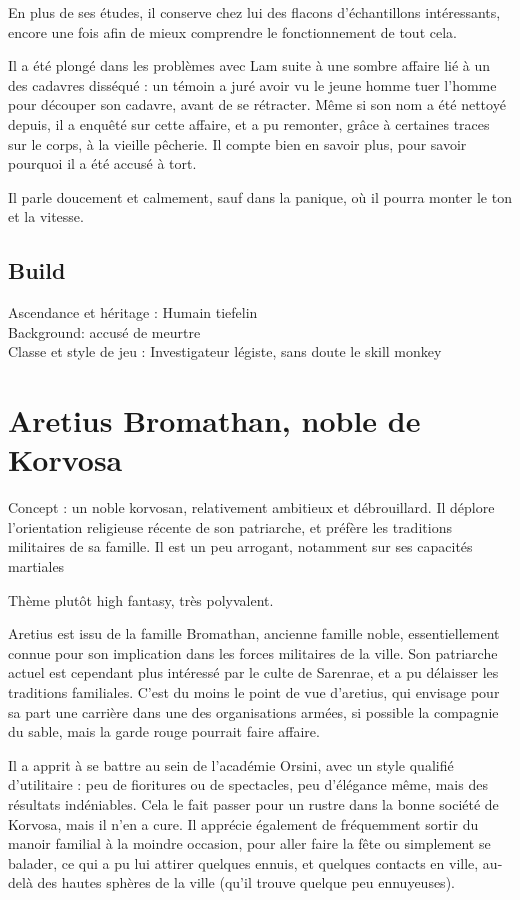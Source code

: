 \documentclass[10pt,a4paper]{book}
\begin{document}
En plus de ses études, il conserve chez lui des flacons d'échantillons intéressants, encore une fois afin de mieux comprendre le fonctionnement de tout cela. 

Il a été plongé dans les problèmes avec Lam suite à une sombre affaire lié à un des cadavres disséqué : un témoin a juré avoir vu le jeune homme tuer l'homme pour découper son cadavre, avant de se rétracter. Même si son nom a été nettoyé depuis, il a enquêté sur cette affaire, et a pu remonter, grâce à certaines traces sur le corps, à la vieille pêcherie. Il compte bien en savoir plus, pour savoir pourquoi il a été accusé à tort.

Il parle doucement et calmement, sauf dans la panique, où il pourra monter le ton et la vitesse.

\subsection{Build}
Ascendance et héritage : Humain tiefelin \\
Background: accusé de meurtre \\
Classe et style de jeu : Investigateur légiste, sans doute le skill monkey\\


\section{Aretius Bromathan, noble de Korvosa}
Concept : un noble korvosan, relativement ambitieux et débrouillard. Il déplore l'orientation religieuse récente de son patriarche, et préfère les traditions militaires de sa famille. Il est un peu arrogant, notamment sur ses capacités martiales

Thème plutôt high fantasy, très polyvalent.

Aretius est issu de la famille Bromathan, ancienne famille noble, essentiellement connue pour son implication dans les forces militaires de la ville. Son patriarche actuel est cependant plus intéressé par le culte de Sarenrae, et a pu délaisser les traditions familiales. C'est du moins le point de vue d'aretius, qui envisage pour sa part une carrière dans une des organisations armées, si possible la compagnie du sable, mais la garde rouge pourrait faire affaire.

Il a apprit à se battre au sein de l'académie Orsini, avec un style qualifié d'utilitaire : peu de fioritures ou de spectacles, peu d'élégance même, mais des résultats indéniables. Cela le fait passer pour un rustre dans la bonne société de Korvosa, mais il n'en a cure. Il apprécie également de fréquemment sortir du manoir familial à la moindre occasion, pour aller faire la fête ou simplement se balader, ce qui a pu lui attirer quelques ennuis, et quelques contacts en ville, au-delà des hautes sphères de la ville (qu'il trouve quelque peu ennuyeuses).
\end{document}
